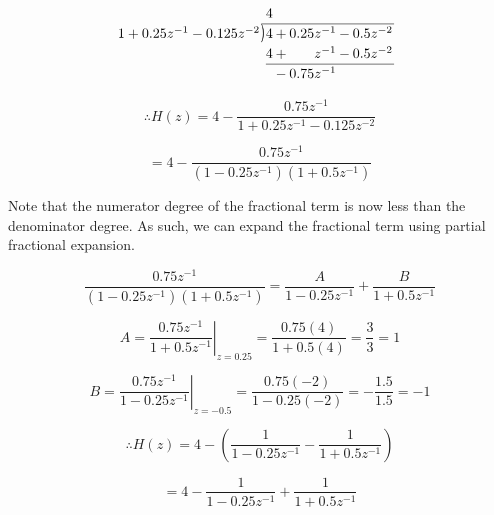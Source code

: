 \documentclass[fleqn]{article}
\newcommand{\longdiv}{\smash{\mkern-0.43mu\vstretch{1.31}{\hstretch{.7}{)}}\mkern-5.2mu\vstretch{1.31}{\hstretch{.7}{)}}}}
\begin{document}
\begin{enumerate}[nolistsep]
\begin{enumerate}[nolistsep]
					\[
					\arraycolsep=1pt
					\renewcommand\arraystretch{1.2}
					\begin{array}{*1r @{\hskip\arraycolsep}c@{\hskip\arraycolsep} *{11}r}
        				& & 4 & & & & & \\
					\cline{2-7}
					1 + 0.25z^{-1} - 0.125z^{-2} & \longdiv & 4 & + & 0.25z^{-1} & - & 0.5z^{-2}\\
        				& & 4 & + & z^{-1} & - & 0.5z^{-2} & & & \\
					\cline{3-7}
        				& & & - & 0.75z^{-1} & & & &
					\end{array}
					\]
					
					\begin{equation*}
						\therefore H(z) = 4 - \frac{0.75z^{-1}}{1 + 0.25z^{-1} - 0.125z^{-2}}
					\end{equation*}
					
					\begin{equation*}
						= 4 - \frac{0.75z^{-1}}{(1 - 0.25z^{-1})(1 + 0.5z^{-1})}
					\end{equation*}
					
					\pagebreak
					Note that the numerator degree of the fractional term is now less than the denominator degree. As such, we can expand the fractional term using partial fractional expansion.
					
					\begin{equation*}
						\frac{0.75z^{-1}}{(1 - 0.25z^{-1})(1 + 0.5z^{-1})} = \frac{A}{1 - 0.25z^{-1}} + \frac{B}{1 + 0.5z^{-1}}
					\end{equation*}
					
					\begin{equation*}
				 		A = \left.\frac{0.75z^{-1}}{1 + 0.5z^{-1}}\right\vert_{z = 0.25} = \frac{0.75(4)}{1 + 0.5(4)} = \frac{3}{3} = 1
				 	\end{equation*}
				 	
				 	\begin{equation*}
				 		B = \left.\frac{0.75z^{-1}}{1 - 0.25z^{-1}}\right\vert_{z = -0.5} = \frac{0.75(-2)}{1 - 0.25(-2)} = -\frac{1.5}{1.5} = -1
				 	\end{equation*}
					
					\begin{equation*}
						\therefore H(z) = 4 - \left(\frac{1}{1-0.25z^{-1}} - \frac{1}{1+0.5z^{-1}}\right)
					\end{equation*}
					
					\begin{equation*}
						= 4 - \frac{1}{1-0.25z^{-1}} + \frac{1}{1+0.5z^{-1}}
					\end{equation*}
					

\end{enumerate}
\end{enumerate}
\end{document}
